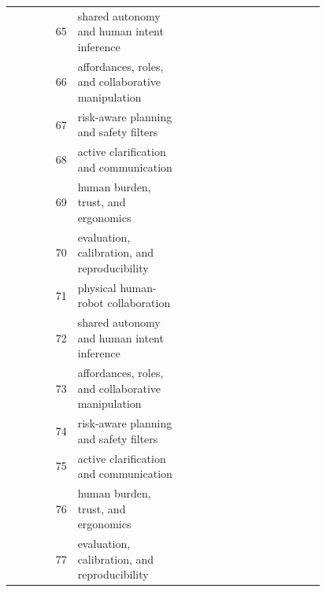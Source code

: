 \documentclass{article}
\begin{document}
\begin{longtable}{r p{0.34\linewidth} p{0.45\linewidth}}
65 & shared autonomy and human intent inference & \citep{pupa2021a193,wang2022computational194,morato2013toward195} \\
66 & affordances, roles, and collaborative manipulation & \citep{rozo2016learning196,roveda2023qlearningbased197,heng2020fluiddriven198} \\
67 & risk-aware planning and safety filters & \citep{cacace2022combining199,chen2013optimal200,vogel2011towards201} \\
68 & active clarification and communication & \citep{maithani2019predicting202,antonelli2019predicting203,tuli2022human204} \\
69 & human burden, trust, and ergonomics & \citep{jo2020analysis205,konstant2024humanrobot206,gustavsson2018humanrobot207} \\
70 & evaluation, calibration, and reproducibility & \citep{liu2019humanrobot208,pang2018development209,mitra2024enhanced210} \\
71 & physical human-robot collaboration & \citep{psarakis2025communicating211,maurice2017velocitycurvature212,tan2009humanrobot213} \\
72 & shared autonomy and human intent inference & \citep{ferraguti2019a214,schroder2025towards215,roncone2017transparent216} \\
73 & affordances, roles, and collaborative manipulation & \citep{flacco2013safe217,rogeau2024collaborative218,rabby2019an219} \\
74 & risk-aware planning and safety filters & \citep{birch2021environmental220,liu2025idagc221,haghshenasjaryani2018a222} \\
75 & active clarification and communication & \citep{khan2026a223,albaba2019modeling224,yang2020human225} \\
76 & human burden, trust, and ergonomics & \citep{urrea2025fatigueaware226,faccio2019the227,huang2023educational228} \\
77 & evaluation, calibration, and reproducibility & \citep{menezes2024mumodar229,hanna2020towards230} \\
\bottomrule
\end{longtable}
\endgroup



\end{document}
